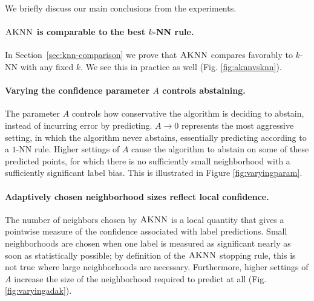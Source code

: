 \documentclass{article}
\newcommand{\algname}{\textsc{AKNN}}
\begin{document}
We briefly discuss our main conclusions from the experiments.

\paragraph*{$\algname$ is comparable to the best $k$-NN rule.}
In Section~\ref{sec:knn-comparison} we prove that $\algname$ compares
favorably to $k$-NN with any fixed $k$. We see this in practice as
well (Fig. \ref{fig:aknnvsknn}).
\paragraph*{Varying the confidence parameter $A$ controls abstaining.}
The parameter $A$ controls how conservative the algorithm is deciding
to abstain, instead of incurring error by predicting. $A \to 0$
represents the most aggressive setting, in which the algorithm never
abstains, essentially predicting according to a $1$-NN rule. Higher
settings of $A$ cause the algorithm to abstain on some of these
predicted points, for which there is no sufficiently small
neighborhood with a sufficiently significant label bias. This is
illustrated in Figure \ref{fig:varyingparam}.
\paragraph*{Adaptively chosen neighborhood sizes reflect local confidence.}
The number of neighbors chosen by $\algname$ is a local quantity that
gives a pointwise measure of the confidence associated with label
predictions. Small neighborhoods are chosen when one label is measured
as significant nearly as soon as statistically possible; by definition
of the $\algname$ stopping rule, this is not true where large
neighborhoods are necessary. Furthermore, higher settings of $A$
increase the size of the neighborhood required to predict at all
(Fig. \ref{fig:varyingadak}).


\end{document}
